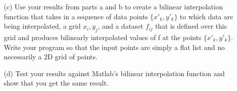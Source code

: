 \documentclass{article}
\begin{document}
\begin{enumerate}
\begin{itemize}
    \item[(c)]  Use your results from parts a and b to create a bilinear interpolation function that takes in a sequence of data points $\{x'_k,y'_k\}$ to which data are being interpolated, a grid $x_i,y_j$, and a dataset $f_{ij}$ that is defined over this grid and produces bilinearly interpolated values of f at the points $\{x'_k,y'_k\}$.  Write your program so that the input points are simply a flat list and no necessarily a 2D grid of points.  
    \item[(d)]  Test your results against Matlab's bilinear interpolation function and show that you get the same result.  
  \end{itemize} 
\end{enumerate}
\end{document}
